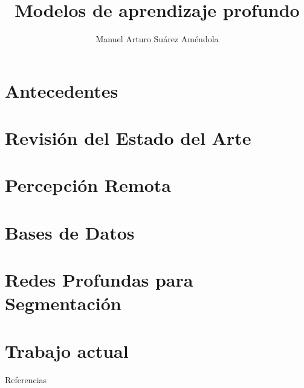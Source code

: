 \documentclass[11pt]{beamer}
\title[Seminario de UAM]
{Modelos de aprendizaje profundo}
\author[Suárez, M.A.]{Manuel Arturo Suárez Améndola}
\begin{document}


\section{Antecedentes}


\section{Revisión del Estado del Arte}


\section{Percepción Remota}


\section{Bases de Datos}


\section{Redes Profundas para Segmentación}


%

\section{Trabajo actual}


\nocite{*}
\begin{frame}[allowframebreaks]{Referencias}


\end{frame}
\end{document}
